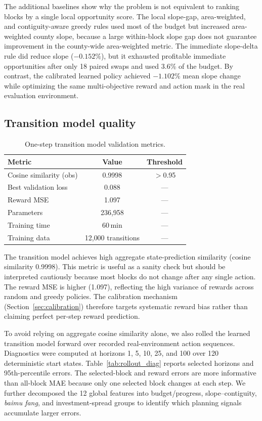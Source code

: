 \documentclass[11pt]{article}
\begin{document}
The additional baselines show why the problem is not equivalent to ranking blocks by a single local opportunity score. The local slope-gap, area-weighted, and contiguity-aware greedy rules used most of the budget but increased area-weighted county slope, because a large within-block slope gap does not guarantee improvement in the county-wide area-weighted metric. The immediate slope-delta rule did reduce slope ($-0.152\%$), but it exhausted profitable immediate opportunities after only 18 paired swaps and used 3.6\% of the budget. By contrast, the calibrated learned policy achieved $-1.102\%$ mean slope change while optimizing the same multi-objective reward and action mask in the real evaluation environment.

\subsection{Transition model quality}
\label{sec:tm_quality}

\begin{table}[htbp]
\centering
\caption{One-step transition model validation metrics.}
\label{tab:tm}
\begin{tabular}{lcc}
\toprule
Metric & Value & Threshold \\
\midrule
Cosine similarity (obs) & 0.9998 & $>$0.95 \\
Best validation loss & 0.088 & --- \\
Reward MSE & 1.097 & --- \\
Parameters & 236{,}958 & --- \\
Training time & 60\,min & --- \\
Training data & 12{,}000 transitions & --- \\
\bottomrule
\end{tabular}
\end{table}

The transition model achieves high aggregate state-prediction similarity (cosine similarity 0.9998). This metric is useful as a sanity check but should be interpreted cautiously because most blocks do not change after any single action. The reward MSE is higher (1.097), reflecting the high variance of rewards across random and greedy policies. The calibration mechanism (Section~\ref{sec:calibration}) therefore targets systematic reward bias rather than claiming perfect per-step reward prediction.

To avoid relying on aggregate cosine similarity alone, we also rolled the learned transition model forward over recorded real-environment action sequences. Diagnostics were computed at horizons 1, 5, 10, 25, and 100 over 120 deterministic start states. Table~\ref{tab:rollout_diag} reports selected horizons and 95th-percentile errors. The selected-block and reward errors are more informative than all-block MAE because only one selected block changes at each step. We further decomposed the 12 global features into budget/progress, slope--contiguity, \textit{baimu fang}, and investment-spread groups to identify which planning signals accumulate larger errors.
\end{document}
